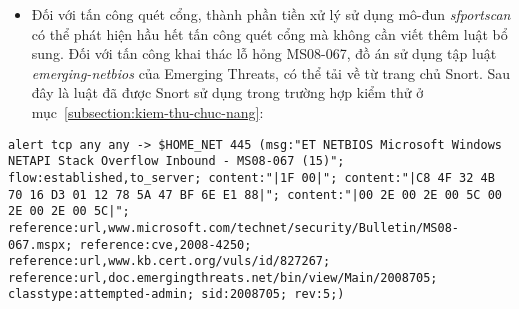 \begin{itemize}
\item Đối với tấn công quét cổng, thành phần tiền xử lý sử dụng mô-đun \emph{sfportscan} có thể phát hiện hầu hết tấn công quét cổng mà không cần viết thêm luật bổ sung. Đối với tấn công khai thác lỗ hỏng MS08-067, đồ án sử dụng tập luật \emph{emerging-netbios} của Emerging Threats, có thể tải về từ trang chủ Snort. Sau đây là luật đã được Snort sử dụng trong trường hợp kiểm thử ở mục~\ref{subsection:kiem-thu-chuc-nang}:\\
\end{itemize}

\begin{lstlisting}
alert tcp any any -> $HOME_NET 445 (msg:"ET NETBIOS Microsoft Windows NETAPI Stack Overflow Inbound - MS08-067 (15)"; flow:established,to_server; content:"|1F 00|"; content:"|C8 4F 32 4B 70 16 D3 01 12 78 5A 47 BF 6E E1 88|"; content:"|00 2E 00 2E 00 5C 00 2E 00 2E 00 5C|"; reference:url,www.microsoft.com/technet/security/Bulletin/MS08-067.mspx; reference:cve,2008-4250; reference:url,www.kb.cert.org/vuls/id/827267; reference:url,doc.emergingthreats.net/bin/view/Main/2008705; classtype:attempted-admin; sid:2008705; rev:5;)
\end{lstlisting}

